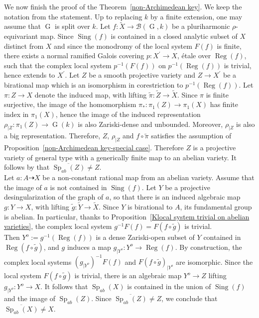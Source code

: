 \documentclass[11pt,letterpaper]{amsart}
\theoremstyle{plain}
\DeclareMathOperator{\Sp}{Sp}
\DeclareMathOperator{\rG}{G}
\DeclareMathOperator{\Sing}{Sing}
\DeclareMathOperator{\Reg}{Reg}
\begin{document}
We now finish the proof of the Theorem~\ref{non-Archimedean key}. We keep the notation from the statement. Up to replacing $k$ by a finite extension, one may assume that $\rG$ is split over $k$. Let $f \colon \tilde{X} \to \mathscr{B}(\rG, k)$ be a pluriharmonic $\rho$-equivariant map. Since $\Sing(f)$ is contained in a closed analytic subset of $X$ \cite[Proposition 1.3.3]{Eyssidieux-reductive} distinct from $X$ and since the monodromy of the local system $F(f)$ is finite, there exists a normal ramified Galois covering $p \colon X^\prime \to X$, étale over $\Reg(f)$, such that the complex local system $p ^{-1} \left(F(f) \right)$ on $p^{-1}\left(\Reg(f) \right)$ is trivial, hence extends to $X^\prime$. Let $Z$ be a smooth projective variety and $Z \to X^\prime$ be a birational map which is an isomorphism in corestriction to $p^{-1}\left(\Reg(f) \right)$. Let $\pi \colon Z \to X$ denote the induced map, with lifting $\tilde \pi \colon \tilde Z \to \tilde X$. Since $\pi$ is finite surjective, the image of the homomorphism $\pi_\ast \colon \pi_1(Z) \to \pi_1(X)$ has finite index in $\pi_1(X)$, hence the image of the induced representation $\rho_{|Z} \colon \pi_1(Z) \to \rG(k)$ is also Zariski-dense and unbounded. Moreover, $\rho_{|Z}$ is also a big representation. Therefore, $Z$, $\rho_{|Z}$ and $f \circ \tilde{\pi}$ satisfies the assumption of Proposition~\ref{non-Archimedean key-special case}. Therefore $Z$ is a projective variety of general type with a generically finite map to an abelian variety. It follows by \cite[Corollary 1]{Yamanoi-maximal-Albanese} that $\overline{\Sp_{ab}(Z)} \neq Z$.\\

Let $a \colon A \dasharrow X$ be a non-constant rational map from an abelian variety. Assume that the image of $a$ is not contained in $\Sing(f)$. Let $Y$ be a projective desingularization of the graph of $a$, so that there is an induced algebraic map $g \colon Y \to X$, with lifting $\tilde g \colon \tilde Y \to \tilde X$. Since $Y$ is birational to $A$, its fundamental group is abelian. In particular, thanks to Proposition~\ref{Klocal system trivial on abelian varieties}, the complex local system $g^{-1} F(f)= F(f \circ \tilde g)$ is trivial.\\

Then $Y^o := g^{-1}(\Reg(f))$ is a dense Zariski-open subset of $Y$ contained in $\Reg(f \circ \tilde g)$, and $g$ induces a map $g_{|Y^o} \colon Y^o \to \Reg(f)$. By construction, the complex local systems $(g_{|Y^o})^{-1} F(f)$ and $F(f \circ \tilde g)_{|Y^o}$ are isomorphic. Since the local system $F(f \circ \tilde g)$ is trivial, there is an algebraic map $Y^o \to Z$ lifting $g_{|Y^o} \colon Y^o \to X$. It follows that $\Sp_{ab}(X)$ is contained in the union of $\Sing(f)$ and the image of $\Sp_{ab}(Z)$. Since $\overline{\Sp_{ab}(Z)} \neq Z$, we conclude that $\overline{\Sp_{ab}(X)} \neq X$.
\end{document}
